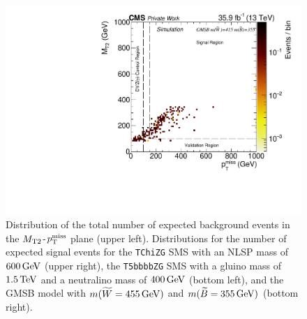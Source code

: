 \begin{figure}[tbp]
 \includegraphics[width=\pairwidth]{figures/plots_2d/DataMC_sameHistograms_LL+signal_onZ__LL__MetMt2_SIG_gmsb_415_355_}
 \caption{Distribution of the total number of expected background events in the $M_{\mathrm{T2}}$-$p_{\mathrm{T}}^\text{miss}$ plane (upper left). Distributions for the number of expected signal events for the \texttt{TChiZG} SMS with an NLSP mass of $600\,\text{Ge\hspace{-.08em}V}$ (upper right), the \texttt{T5bbbbZG} SMS with a gluino mass of $1.5\,\text{Te\hspace{-.08em}V}$ and a neutralino mass of $400\,\text{Ge\hspace{-.08em}V}$ (bottom left), and the GMSB model with $m(\widetilde{W}=455\,\text{Ge\hspace{-.08em}V})$ and $m(\widetilde{B}=355\,\text{Ge\hspace{-.08em}V})$ (bottom right).}
 \label{fig:Regions2}
\end{figure}



